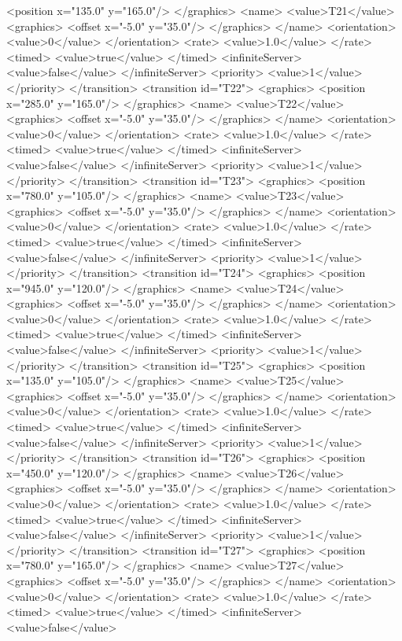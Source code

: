 <position x="135.0" y="165.0"/>
</graphics>
<name>
<value>T21</value>
<graphics>
<offset x="-5.0" y="35.0"/>
</graphics>
</name>
<orientation>
<value>0</value>
</orientation>
<rate>
<value>1.0</value>
</rate>
<timed>
<value>true</value>
</timed>
<infiniteServer>
<value>false</value>
</infiniteServer>
<priority>
<value>1</value>
</priority>
</transition>
<transition id="T22">
<graphics>
<position x="285.0" y="165.0"/>
</graphics>
<name>
<value>T22</value>
<graphics>
<offset x="-5.0" y="35.0"/>
</graphics>
</name>
<orientation>
<value>0</value>
</orientation>
<rate>
<value>1.0</value>
</rate>
<timed>
<value>true</value>
</timed>
<infiniteServer>
<value>false</value>
</infiniteServer>
<priority>
<value>1</value>
</priority>
</transition>
<transition id="T23">
<graphics>
<position x="780.0" y="105.0"/>
</graphics>
<name>
<value>T23</value>
<graphics>
<offset x="-5.0" y="35.0"/>
</graphics>
</name>
<orientation>
<value>0</value>
</orientation>
<rate>
<value>1.0</value>
</rate>
<timed>
<value>true</value>
</timed>
<infiniteServer>
<value>false</value>
</infiniteServer>
<priority>
<value>1</value>
</priority>
</transition>
<transition id="T24">
<graphics>
<position x="945.0" y="120.0"/>
</graphics>
<name>
<value>T24</value>
<graphics>
<offset x="-5.0" y="35.0"/>
</graphics>
</name>
<orientation>
<value>0</value>
</orientation>
<rate>
<value>1.0</value>
</rate>
<timed>
<value>true</value>
</timed>
<infiniteServer>
<value>false</value>
</infiniteServer>
<priority>
<value>1</value>
</priority>
</transition>
<transition id="T25">
<graphics>
<position x="135.0" y="105.0"/>
</graphics>
<name>
<value>T25</value>
<graphics>
<offset x="-5.0" y="35.0"/>
</graphics>
</name>
<orientation>
<value>0</value>
</orientation>
<rate>
<value>1.0</value>
</rate>
<timed>
<value>true</value>
</timed>
<infiniteServer>
<value>false</value>
</infiniteServer>
<priority>
<value>1</value>
</priority>
</transition>
<transition id="T26">
<graphics>
<position x="450.0" y="120.0"/>
</graphics>
<name>
<value>T26</value>
<graphics>
<offset x="-5.0" y="35.0"/>
</graphics>
</name>
<orientation>
<value>0</value>
</orientation>
<rate>
<value>1.0</value>
</rate>
<timed>
<value>true</value>
</timed>
<infiniteServer>
<value>false</value>
</infiniteServer>
<priority>
<value>1</value>
</priority>
</transition>
<transition id="T27">
<graphics>
<position x="780.0" y="165.0"/>
</graphics>
<name>
<value>T27</value>
<graphics>
<offset x="-5.0" y="35.0"/>
</graphics>
</name>
<orientation>
<value>0</value>
</orientation>
<rate>
<value>1.0</value>
</rate>
<timed>
<value>true</value>
</timed>
<infiniteServer>
<value>false</value>
